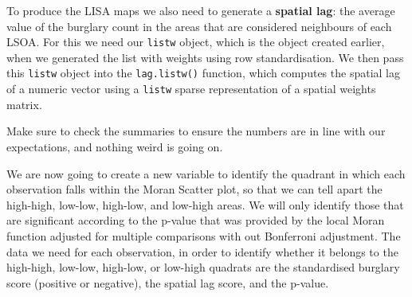 \documentclass[
  krantz2]{krantz}
\makeatletter
\newenvironment{Shaded}{\begin{snugshade}}{\end{snugshade}}
\newcommand{\CommentTok}[1]{\textcolor[rgb]{0.37,0.37,0.37}{\textit{#1}}}
\newcommand{\FunctionTok}[1]{\textcolor[rgb]{0,0,0}{#1}}
\newcommand{\NormalTok}[1]{#1}
\newcommand{\OtherTok}[1]{\textcolor[rgb]{0.37,0.37,0.37}{#1}}
\newcommand{\SpecialCharTok}[1]{\textcolor[rgb]{0,0,0}{#1}}
\newcommand{\StringTok}[1]{\textcolor[rgb]{0.5,0.5,0.5}{#1}}
\newenvironment{kframe}{%
\medskip{}
\setlength{\fboxsep}{.8em}
 \def\at@end@of@kframe{}%
 \ifinner\ifhmode%
  \def\at@end@of@kframe{\end{minipage}}%
  \begin{minipage}{\columnwidth}%
 \fi\fi%
 \def\FrameCommand##1{\hskip\@totalleftmargin \hskip-\fboxsep
 \colorbox{shadecolor}{##1}\hskip-\fboxsep
     \hskip-\linewidth \hskip-\@totalleftmargin \hskip\columnwidth}%
 \MakeFramed {\advance\hsize-\width
   \@totalleftmargin\z@ \linewidth\hsize
   \@setminipage}}%
 {\par\unskip\endMakeFramed%
 \at@end@of@kframe}
\renewenvironment{Shaded}{\begin{kframe}}{\end{kframe}}
\makeatother
\begin{document}
\begin{Shaded}
\end{Shaded}

To produce the LISA maps we also need to generate a \textbf{spatial lag}: the average value of the burglary count in the areas that are considered neighbours of each LSOA. For this we need our \texttt{listw} object, which is the object created earlier, when we generated the list with weights using row standardisation. We then pass this \texttt{listw} object into the \texttt{lag.listw()} function, which computes the spatial lag of a numeric vector using a \texttt{listw} sparse representation of a spatial weights matrix.

\begin{Shaded}
\end{Shaded}

Make sure to check the summaries to ensure the numbers are in line with our expectations, and nothing weird is going on.

\begin{Shaded}
\end{Shaded}

We are now going to create a new variable to identify the quadrant in which each observation falls within the Moran Scatter plot, so that we can tell apart the high-high, low-low, high-low, and low-high areas. We will only identify those that are significant according to the p-value that was provided by the local Moran function adjusted for multiple comparisons with out Bonferroni adjustment. The data we need for each observation, in order to identify whether it belongs to the high-high, low-low, high-low, or low-high quadrats are the standardised burglary score (positive or negative), the spatial lag score, and the p-value.
\end{document}
